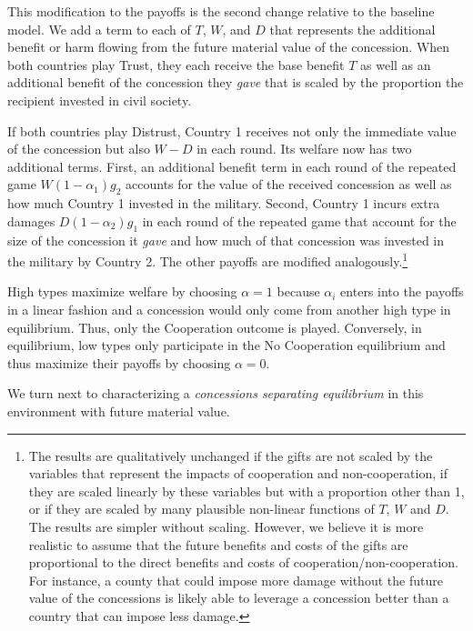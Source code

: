 \documentclass[bibtex,autowc]{apsr_submission}
\newcommand{\al}{\alpha}
\begin{document}
This modification to the payoffs is the second change relative to the baseline model. We add a term to each of $T$, $W$, and $D$ that represents the additional benefit or harm flowing from the future material value of the concession. When both countries play Trust, they each receive the base benefit $T$ as well as an additional benefit of the concession they \textit{gave} that is scaled by the proportion the recipient invested in civil society.

If both countries play Distrust, Country 1 receives not only the immediate value of the concession but also $W-D$ in each round. Its welfare now has two additional terms. First, an additional benefit term in each round of the repeated game $W(1-\alpha_1) g_2$ accounts for the value of the received concession as well as how much Country 1 invested in the military. Second, Country 1 incurs extra damages $D(1-\alpha_2) g_1$ in each round of the repeated game that account for the size of the concession it \textit{gave} and how much of that concession was invested in the military by Country 2. The other payoffs are modified analogously.\footnote{The results are qualitatively unchanged if the gifts are not scaled by the variables that represent the impacts of cooperation and non-cooperation, if they are scaled linearly by these variables but with a proportion other than 1, or if they are scaled by many plausible non-linear functions of $T$, $W$ and $D$. The results are simpler without scaling. However, we believe it is more realistic to assume that the future benefits and costs of the gifts are proportional to the direct benefits and costs of cooperation/non-cooperation. For instance, a county that could impose more damage without the future value of the concessions is likely able to leverage a concession better than a country that can impose less damage.}

High types maximize welfare by choosing $\alpha=1$ because $\al_i$ enters into the payoffs in a linear fashion and a concession would only come from another high type in equilibrium. Thus, only the Cooperation outcome is played. Conversely, in equilibrium, low types only participate in the No Cooperation equilibrium and thus maximize their payoffs by choosing $\alpha=0$. 

We turn next to characterizing a \emph{concessions separating equilibrium} in this environment with future material value.
\end{document}
